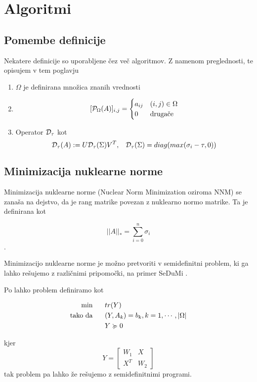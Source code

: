 \chapter{Algoritmi}

\section{Pomembe definicije}
Nekatere definicije so uporabljene čez več algoritmov. Z namenom preglednosti, te opisujem v tem poglavju
\begin{enumerate}
  \item $\Omega$ je definirana množica znanih vrednosti
  \item \[ [\mathcal{P}_\Omega(A)]_{i,j} = \begin{cases}
            a_{ij} & (i, j) \in \Omega \\
            0      & \textrm{drugače}
          \end{cases}
        \]
  \item Operator $\mathcal{D}_\tau$ kot \[
            \mathcal{D}_\tau(A) := U \mathcal{D}_\tau(\Sigma) V^T, \hspace{0.3cm} \mathcal{D}_\tau(\Sigma) = diag(max(\sigma_i - \tau, 0))
        \] \cite{CCS}
\end{enumerate}

\section{Minimizacija nuklearne norme}
Minimizacija nuklearne norme (Nuclear Norm Minimization oziroma NNM) se zanaša na dejstvo, da je rang matrike povezan z nuklearno normo matrike. Ta je definirana kot

\[
  ||A||_* = \sum_{i = 0}^{n} \sigma_i
\].

Minimizacijo nuklearne norme je možno pretvoriti v semidefinitni problem, ki ga lahko rešujemo z različnimi pripomočki, na primer SeDuMi \cite{SeDuMi}.

Po \cite{CR08} lahko problem definiramo kot

\begin{align*}
  \textrm{min }     & \hspace{0.5cm} tr(Y)                                    \\
  \textrm{tako da } & \hspace{0.5cm} (Y, A_k) = b_k, k = 1, \cdots , |\Omega| \\
                    & \hspace{0.5cm} Y \succcurlyeq 0
\end{align*}

kjer
\[
  Y = \begin{bmatrix}
    W_1 & X   \\
    X^T & W_2
  \end{bmatrix}
\] tak problem pa lahko že rešujemo z semidefinitnimi programi.


